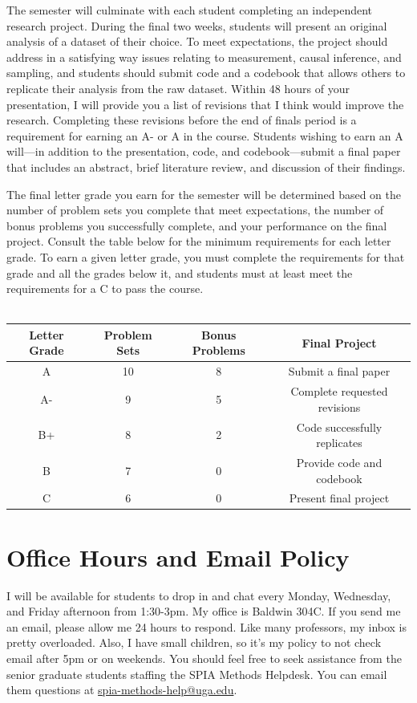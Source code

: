 \documentclass[11pt, letterpaper]{article}
\begin{document}
The semester will culminate with each student completing an independent research project. During the final two weeks, students will present an original analysis of a dataset of their choice. To meet expectations, the project should address in a satisfying way issues relating to measurement, causal inference, and sampling, and students should submit code and a codebook that allows others to replicate their analysis from the raw dataset. Within 48 hours of your presentation, I will provide you a list of revisions that I think would improve the research. Completing these revisions before the end of finals period is a requirement for earning an A- or A in the course. Students wishing to earn an A will---in addition to the presentation, code, and codebook---submit a final paper that includes an abstract, brief literature review, and discussion of their findings.

The final letter grade you earn for the semester will be determined based on the number of problem sets you complete that meet expectations, the number of bonus problems you successfully complete, and your performance on the final project. Consult the table below for the minimum requirements for each letter grade. To earn a given letter grade, you must complete the requirements for that grade and all the grades below it, and students must at least meet the requirements for a C to pass the course.\\\\
\begin{tabular}{|c|c|c|c|}
	\hline
	Letter Grade & Problem Sets & Bonus Problems & Final Project \\
	\hline
	A & 10 & 8 & Submit a final paper \\
	\hline
	A- & 9 & 5 & Complete requested revisions \\
	\hline
	B+ & 8 & 2 & Code successfully replicates \\
	\hline
	B & 7 & 0 & Provide code and codebook \\
	\hline
	C & 6 & 0 & Present final project \\
	\hline
\end{tabular} 

\section*{Office Hours and Email Policy}
I will be available for students to drop in and chat every Monday, Wednesday, and Friday afternoon from 1:30-3pm. My office is Baldwin 304C. If you send me an email, please allow me 24 hours to respond. Like many professors, my inbox is pretty overloaded. Also, I have small children, so it's my policy to not check email after 5pm or on weekends. You should feel free to seek assistance from the senior graduate students staffing the SPIA Methods Helpdesk. You can email them questions at \href{mailto:spia-methods-help@uga.edu}{spia-methods-help@uga.edu}.
\end{document}
